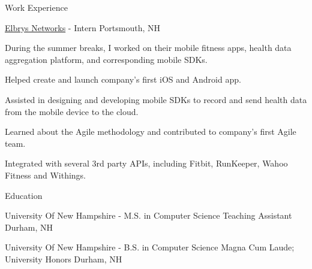 \documentclass[UKenglish]{resume} %
\begin{document}
\begin{rSection}{Work Experience}
\begin{rSubsection}
    \end{rSubsection}

    \begin{rSubsection}
        {\href{}{Elbrys Networks}}
        {  -  }
        {Intern}
        {Portsmouth, NH}

        \item During the summer breaks, I worked on their mobile fitness apps, health data aggregation platform, and corresponding mobile SDKs.
        \item Helped create and launch company’s first iOS and Android app.
        \item Assisted in designing and developing mobile SDKs to record and send health data from the mobile device to the cloud.
        \item Learned about the Agile methodology and contributed to company's first Agile team.
        \item Integrated with several 3rd party APIs, including Fitbit, RunKeeper, Wahoo Fitness and Withings.
    \end{rSubsection}

\end{rSection}



\begin{rSection}{ Education }

    \rSubsectionHeading
        {University Of New Hampshire}
        {  -  }
        {\normalfont M.S. in Computer Science}
        {\normalfont Teaching Assistant}
        {Durham, NH}

    \rSubsectionHeading
        {University Of New Hampshire}
        {  -  }
        {\normalfont B.S. in Computer Science}
        {\normalfont Magna Cum Laude; University Honors}
        {Durham, NH}

\end{rSection}
\end{document}
